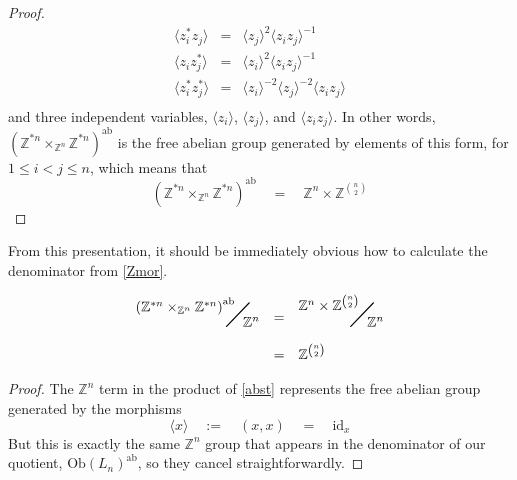\documentclass{amsbook} %
\newcommand{\bigquotient}[2]{ \raisebox{0.75\height}{$#1$} \mkern-12mu\scalebox{2}{$\diagup$}\mkern-10mu \raisebox{-0.5\height}{$#2$} }
\numberwithin{section}{chapter}
\begin{document}
\begin{proof}
\[\begin{array}{rll}
			\langle z_i^* z_j \rangle & = & \langle z_j \rangle^2 \langle z_i z_j \rangle^{-1} \\
			\langle z_i z_j^* \rangle & = & \langle z_i \rangle^2 \langle z_i z_j \rangle^{-1} \\
			\langle z_i^* z_j^* \rangle & = & \langle z_i \rangle^{-2} \langle z_j \rangle^{-2} \langle z_i z_j \rangle \\
		\end{array}
\]
and three independent variables, $\langle z_i \rangle$, $\langle z_j \rangle$, and $\langle z_i z_j \rangle$. In other words, $(\mathbb{Z}^{\ast n} \times_{\mathbb{Z}^n} \mathbb{Z}^{\ast n})^{\mathrm{ab}}$ is the free abelian group generated by elements of this form, for $1 \le i < j \le n$, which means that
\[ (\mathbb{Z}^{\ast n} \times_{\mathbb{Z}^n} \mathbb{Z}^{\ast n})^{\mathrm{ab}} \quad = \quad \mathbb{Z}^n \times \mathbb{Z}^{{n}\choose{2}} \]
\end{proof}

From this presentation, it should be immediately obvious how to calculate the denominator from \cref{Zmor}.

\begin{cor} \label{nchoose2}
\[ \begin{array}{rll}
			 \bigquotient{{(\mathbb{Z}^{\ast n} \times_{\mathbb{Z}^n} \mathbb{Z}^{\ast n})}^{\mathrm{ab}}}{\mathbb{Z}^n} & = & \bigquotient{\mathbb{Z}^n \times \mathbb{Z}^{{n}\choose{2}}}{\mathbb{Z}^n} \\[\bigskipamount]
			& = & \mathbb{Z}^{{n}\choose{2}} 
		\end{array}
\]
\end{cor}
\begin{proof}
The $\mathbb{Z}^n$ term in the product of \cref{abst} represents the free abelian group generated by the morphisms
\[ \langle x \rangle \quad := \quad (x,x) \quad = \quad \mathrm{id}_{x} \]
But this is exactly the same $\mathbb{Z}^n$ group that appears in the denominator of our quotient, $\mathrm{Ob}(L_n)^{\mathrm{ab}}$, so they cancel straightforwardly.
\end{proof}
\end{document}
